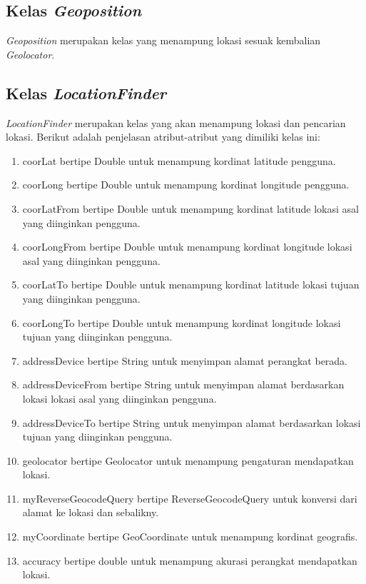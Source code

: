 \subsection{Kelas \textit{Geoposition}}
\label{lab:Kelas Geoposition}
\hspace{0.5cm} \textit{Geoposition} merupakan kelas yang menampung lokasi sesuak kembalian \textit{Geolocator}.

\subsection{Kelas \textit{LocationFinder}}
\label{lab:Kelas LocationFinder}
\hspace{0.5cm} \textit{LocationFinder} merupakan kelas yang akan menampung lokasi dan pencarian lokasi. Berikut adalah penjelasan atribut-atribut yang dimiliki kelas ini:
\begin{enumerate}
	\item coorLat bertipe Double untuk menampung kordinat latitude pengguna.
	\item coorLong bertipe Double untuk menampung kordinat longitude pengguna.
	\item coorLatFrom bertipe Double untuk menampung kordinat latitude lokasi asal yang diinginkan pengguna.
	\item coorLongFrom bertipe Double untuk menampung kordinat longitude lokasi asal yang diinginkan pengguna.
	\item coorLatTo bertipe Double untuk menampung kordinat latitude lokasi tujuan yang diinginkan pengguna.
	\item coorLongTo bertipe Double untuk menampung kordinat longitude lokasi tujuan yang diinginkan pengguna.
	
	\item addressDevice bertipe String untuk menyimpan alamat perangkat berada.
	\item addressDeviceFrom bertipe String untuk menyimpan alamat berdasarkan lokasi lokasi asal yang diinginkan pengguna.
	\item addressDeviceTo bertipe String untuk menyimpan alamat berdasarkan lokasi tujuan yang diinginkan pengguna.
	
	\item geolocator bertipe Geolocator untuk menampung pengaturan mendapatkan lokasi.
	\item myReverseGeocodeQuery bertipe ReverseGeocodeQuery untuk konversi dari alamat ke lokasi dan sebalikny.
	\item myCoordinate bertipe GeoCoordinate untuk menampung kordinat geografis.
	\item accuracy bertipe double untuk menampung akurasi perangkat mendapatkan lokasi.
\end{enumerate}

